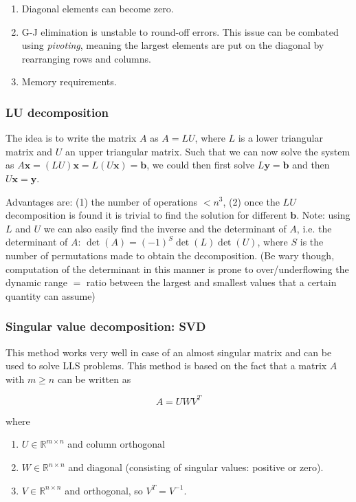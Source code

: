 \documentclass[a4paper]{article}
\newcommand{\R}{\mathbb{R}}
\begin{document}
\begin{enumerate}[(1)]
    \item Diagonal elements can become zero.
    \item G-J elimination is unstable to round-off errors. This issue can be combated using \textit{pivoting}, meaning the largest elements are put on the diagonal by rearranging rows and columns.
    \item Memory requirements.
\end{enumerate}

\subsubsection{LU decomposition}

The idea is to write the matrix $A$ as $A=LU$, where $L$ is a lower triangular matrix and $U$ an upper triangular matrix. Such that we can now solve the system as $A\mathbf{x}=(LU)\mathbf{x}=L(U\mathbf{x})=\mathbf{b}$, we could then first solve $L\mathbf{y}=\mathbf{b}$ and then $U\mathbf{x}=\mathbf{y}$.

\bigskip

Advantages are: (1) the number of operations $< n^3$, (2) once the $LU$ decomposition is found it is trivial to find the solution for different $\mathbf{b}$. Note: using $L$ and $U$ we can also easily find the inverse and the determinant of $A$, i.e. the determinant of $A$: $\det(A)=(-1)^S\det(L)\det(U)$, where $S$ is the number of permutations made to obtain the decomposition. (Be wary though, computation of the determinant in this manner is prone to over/underflowing the dynamic range $=$ ratio between the largest and smallest values that a certain quantity can assume)

\subsubsection{Singular value decomposition: SVD}

This method works very well in case of an almost singular matrix and can be used to solve LLS problems. This method is based on the fact that a matrix $A$ with $m\ge n$ can be written as

\begin{equation*}
    A=UWV^T
\end{equation*}

where 

\begin{enumerate}[(1)]
    \item $U\in\R^{m\times n}$ and column orthogonal
    \item $W\in\R^{n\times n}$ and diagonal (consisting of singular values: positive or zero).
    \item $V\in\R^{n\times n}$ and orthogonal, so $V^T=V^{-1}$.
\end{enumerate}
\end{document}

